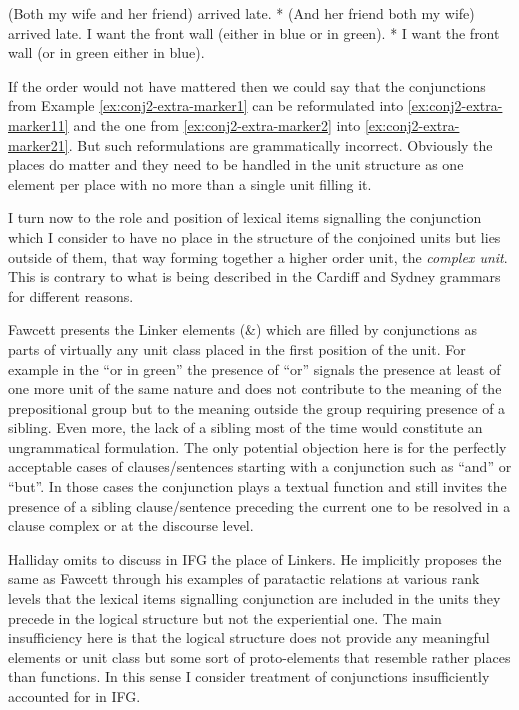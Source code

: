     \begin{exe}
    	\ex\label{ex:conj2-extra-marker1}
    	(Both my wife and her friend) arrived late.  
    	\ex\label{ex:conj2-extra-marker11} * (And her friend both my wife) arrived late.
    	\ex\label{ex:conj2-extra-marker2}
    	I want the front wall (either in blue or in green). 
    	\ex\label{ex:conj2-extra-marker21}
    	* I want the front wall (or in green either in blue). 
    \end{exe}
    
    If the order would not have mattered then we could say that the conjunctions from Example \ref{ex:conj2-extra-marker1} can be reformulated into \ref{ex:conj2-extra-marker11} and the one from \ref{ex:conj2-extra-marker2} into \ref{ex:conj2-extra-marker21}. But such reformulations are grammatically incorrect. Obviously the places do matter and they need to be handled in the unit structure as one element per place with no more than a single unit filling it.
    
    I turn now to the role and position of lexical items signalling the conjunction which I consider to have no place in the structure of the conjoined units but lies outside of them, that way forming together a higher order unit, the \textit{complex unit}. This is contrary to what is being described in the Cardiff and Sydney grammars for different reasons. 
    
    Fawcett presents the Linker elements (\&) which are filled by conjunctions as parts of virtually any unit class placed in the first position of the unit. For example in the ``or in green'' the presence of ``or'' signals the presence at least of one more unit of the same nature and does not contribute to the meaning of the prepositional group but to the meaning outside the group requiring presence of a sibling. Even more, the lack of a sibling most of the time would constitute an ungrammatical formulation. The only potential objection here is for the perfectly acceptable cases of clauses/sentences starting with a conjunction such as ``and'' or ``but''. In those cases the conjunction plays a textual function and still invites the presence of a sibling clause/sentence preceding the current one to be resolved in a clause complex or at the discourse level. 
    
    Halliday omits to discuss in IFG \citep{Halliday2013} the place of Linkers. He implicitly proposes the same as Fawcett through his examples of paratactic relations at various rank levels \citep[422, 534, 564, 566]{Halliday2013} that the lexical items signalling conjunction are included in the units they precede in the logical structure but not the experiential one. The main insufficiency here is that the logical structure does not provide any meaningful elements or unit class but some sort of proto-elements that resemble rather places than functions. In this sense I consider treatment of conjunctions insufficiently accounted for in IFG.  

